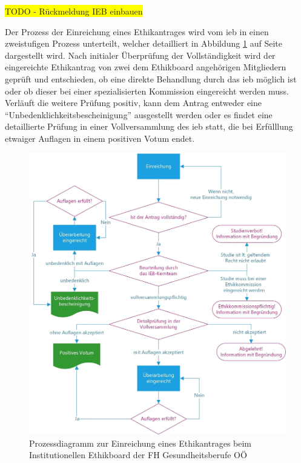 \colorbox{yellow}{TODO - Rückmeldung IEB einbauen}

Der Prozess der Einreichung eines Ethikantrages wird vom \ac{ieb} in einen zweistufigen Prozess unterteilt, welcher detailliert in Abbildung \ref{fig:prozess-ethikantrag-ieb} auf Seite \pageref{fig:dokumentenvorlage-ieb} dargestellt wird. Nach initialer Überprüfung der Vollständigkeit wird der eingereichte Ethikantrag von zwei dem Ethikboard angehörigen Mitgliedern geprüft und entschieden, ob eine direkte Behandlung durch das \ac{ieb} möglich ist oder ob dieser bei einer spezialisierten Kommission eingereicht werden muss. Verläuft die weitere Prüfung positiv, kann dem Antrag entweder eine \enquote{Unbedenklichkeitsbescheinigung} ausgestellt werden oder es findet eine detaillierte Prüfung in einer Vollversammlung des \ac{ieb} statt, die bei Erfülllung etwaiger Auflagen in einem positiven Votum endet.\cite{fh_gesundheitsberufe_oo_gmbh_einreichung_2023}

\begin{figure}[ht]
    \centering
    \includegraphics[scale=0.15]{thesis/images/FHGOOE_Prozess-Ethikantrag.jpg}
    \caption[Prozessdiagramm zur Einreichung eines Ethikantrages beim Institutionellen Ethikboard der FH Gesundheitsberufe OÖ]{Prozessdiagramm zur Einreichung eines Ethikantrages beim Institutionellen Ethikboard der FH Gesundheitsberufe OÖ \cite{fh_gesundheitsberufe_oo_gmbh_einreichung_2023}}
    \label{fig:prozess-ethikantrag-ieb}
\end{figure}

